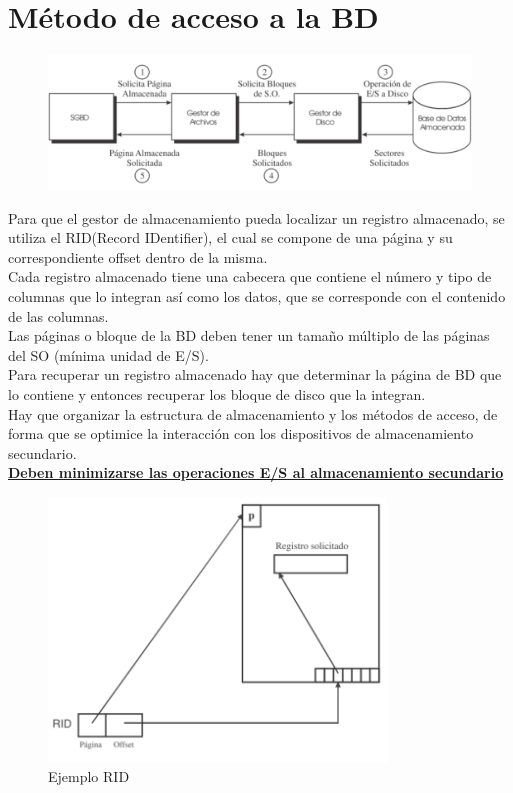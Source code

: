 \documentclass[a4paper,11pt]{article}
\begin{document}
\section{Método de acceso a la BD}

\begin{figure}[h]
\centering
\includegraphics[scale=1,width=1.0\textwidth]{transformacion.png}
\end{figure}

Para que el gestor de almacenamiento pueda localizar un registro almacenado, se utiliza el RID(Record IDentifier), el cual se compone de una página y su correspondiente offset dentro de la misma. \\

Cada registro almacenado tiene una cabecera que contiene el número y tipo de columnas que lo integran así como los datos, que se corresponde con el contenido de las columnas. \\

Las páginas o bloque de la BD deben tener un tamaño múltiplo de las páginas del SO (mínima unidad de E/S). \\

Para recuperar un registro almacenado hay que determinar la página de BD que lo contiene y entonces recuperar los bloque de disco que la integran. \\

Hay que organizar la estructura de almacenamiento y los métodos de acceso, de forma que se optimice la interacción con los dispositivos de almacenamiento secundario. \\

\textbf{\underline{Deben minimizarse las operaciones E/S al almacenamiento secundario}} \\

\begin{figure}
\centering
\caption{Ejemplo RID}
\includegraphics[scale=1,width=0.8\textwidth]{rid.png}
\end{figure}
\end{document}
